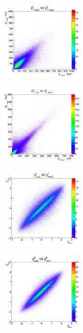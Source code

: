 \begin{figure}[t]
\centering
\begin{subfigure}
  \centering
  \includegraphics[width=0.45\textwidth]{05_kinReco/plots/scatter/pt-t.png}
\end{subfigure}
\begin{subfigure}
  \centering
  \includegraphics[width=0.45\textwidth]{05_kinReco/plots/scatter/pTtt-scaterPlot.png}
\end{subfigure}
\begin{subfigure}
  \centering
  \includegraphics[width=0.45\textwidth]{05_kinReco/plots/scatter/y-t.png}
\end{subfigure}
\begin{subfigure}
  \centering
  \includegraphics[width=0.45\textwidth]{05_kinReco/plots/scatter/y-tt.png}

\end{subfigure}
\end{figure}

